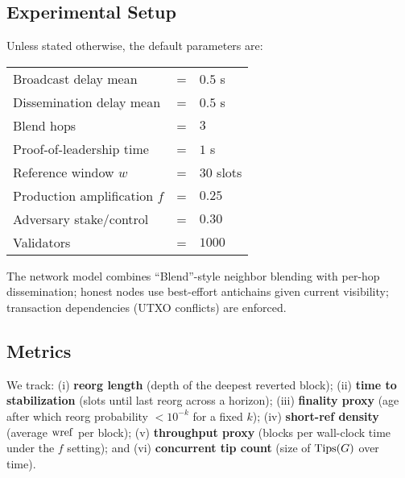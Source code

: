 \subsection{Experimental Setup}
Unless stated otherwise, the default parameters are:
\begin{center}
\begin{tabular}{lcl}
\toprule
Broadcast delay mean & = & $0.5$ s\\
Dissemination delay mean & = & $0.5$ s\\
Blend hops & = & $3$\\
Proof-of-leadership time & = & $1$ s\\
Reference window $w$ & = & $30$ slots\\
Production amplification $f$ & = & $0.25$\\
Adversary stake/control & = & $0.30$ \\
Validators & = & $1000$ \\
\bottomrule
\end{tabular}
\end{center}
The network model combines “Blend”-style neighbor blending with per-hop dissemination; honest nodes use best-effort antichains given current visibility; transaction dependencies (UTXO conflicts) are enforced.

\subsection{Metrics}
We track: (i) \textbf{reorg length} (depth of the deepest reverted block); (ii) \textbf{time to stabilization} (slots until last reorg across a horizon); (iii) \textbf{finality proxy} (age after which reorg probability $<10^{-k}$ for a fixed $k$); (iv) \textbf{short-ref density} (average $\mathrm{wref}$ per block); (v) \textbf{throughput proxy} (blocks per wall-clock time under the $f$ setting); and (vi) \textbf{concurrent tip count} (size of $\mathrm{Tips}(G)$ over time).

